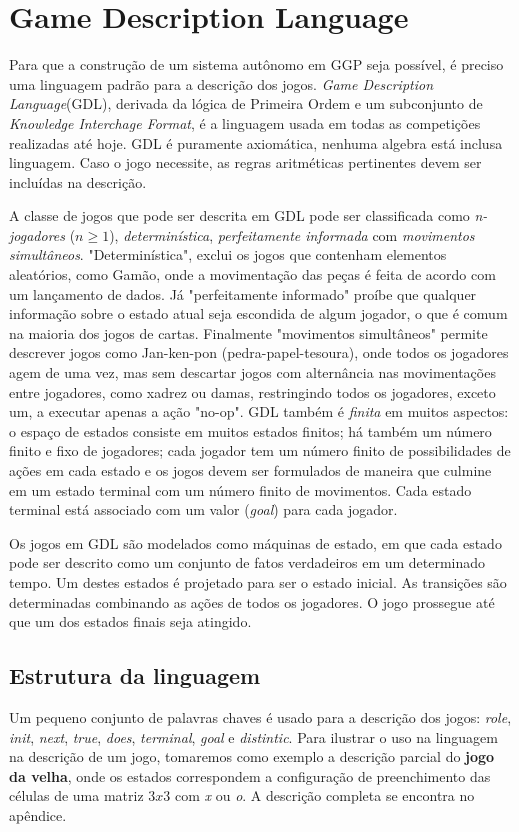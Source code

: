 \chapter{Game Description Language}
\label{gdl}

Para que a construção de um sistema autônomo em GGP seja possível, é preciso uma linguagem padrão para a descrição dos jogos. \textit{Game Description Language}\cite{gdl}(GDL), derivada da lógica de Primeira Ordem e um subconjunto de \textit{Knowledge Interchage Format}, é a linguagem usada em todas as competições realizadas até hoje. GDL é puramente axiomática, nenhuma algebra está inclusa linguagem. Caso o jogo necessite, as regras aritméticas pertinentes devem ser incluídas na descrição.

A classe de jogos que pode ser descrita em GDL pode ser classificada como \textit{n-jogadores} ($n \geq 1 $), \textit{determinística}, \textit{perfeitamente informada} com \textit{movimentos simultâneos}. "Determinística", exclui os jogos que contenham elementos aleatórios, como Gamão, onde a movimentação das peças é feita de acordo com um lançamento de dados. Já "perfeitamente informado" proíbe que qualquer informação sobre o estado atual seja escondida de algum jogador, o que é comum na maioria dos jogos de cartas. Finalmente "movimentos simultâneos" permite descrever jogos como Jan-ken-pon (pedra-papel-tesoura), onde todos os jogadores agem de uma vez, mas sem descartar jogos com alternância nas movimentações entre jogadores, como xadrez ou damas, restringindo todos os jogadores, exceto um, a executar apenas a ação "no-op". GDL também é \textit{finita} em muitos aspectos: o espaço de estados consiste em muitos estados finitos; há também um número finito e fixo de jogadores; cada jogador tem um número finito de possibilidades de ações em cada estado e os jogos devem ser formulados de maneira que culmine em um estado terminal com um número finito de movimentos. Cada estado terminal está associado com um valor (\textit{goal}) para cada jogador. 

Os jogos em GDL são modelados como máquinas de estado, em que cada estado pode ser descrito como um conjunto de fatos verdadeiros em um determinado tempo. Um destes estados é projetado para ser o estado inicial. As transições são determinadas combinando as ações de todos os jogadores. O jogo prossegue até que um dos estados finais seja atingido.

\section{Estrutura da linguagem}
Um pequeno conjunto de palavras chaves é usado para a descrição dos jogos: \textit{role}, \textit{init}, \textit{next}, \textit{true}, \textit{does}, \textit{terminal}, \textit{goal} e \textit{distintic}. Para ilustrar o uso na linguagem na descrição de um jogo, tomaremos como exemplo a descrição parcial do \textbf{jogo da velha}, onde os estados correspondem a configuração de preenchimento das células de uma matriz $3x3$ com \textit{x} ou \textit{o}. A descrição completa se encontra no apêndice.


